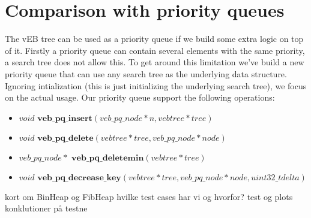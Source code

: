 \section*{Comparison with priority queues}
The vEB tree can be used as a priority queue if we build some extra logic on top of it. Firstly a priority queue can contain several elements with the same priority, a search tree does not allow this. To get around this limitation we've build a new priority queue that can use any search tree as the underlying data structure. Ignoring intialization (this is just initializing the underlying search tree), we focus on the actual usage. Our priority queue support the following operations:

\begin{itemize}
  \item $void \textbf{ veb\_pq\_insert}(veb\_pq\_node * n, vebtree * tree)$
  \item $void \textbf{ veb\_pq\_delete}(vebtree * tree, veb\_pq\_node * node)$
  \item $veb\_pq\_node * \textbf{ veb\_pq\_deletemin}(vebtree * tree)$
  \item $void \textbf{ veb\_pq\_decrease\_key}(vebtree * tree, veb\_pq\_node * node, uint32\_t delta)$
\end{itemize}



kort om BinHeap og FibHeap
hvilke test cases har vi og hvorfor?
test og plots
konklutioner på testne